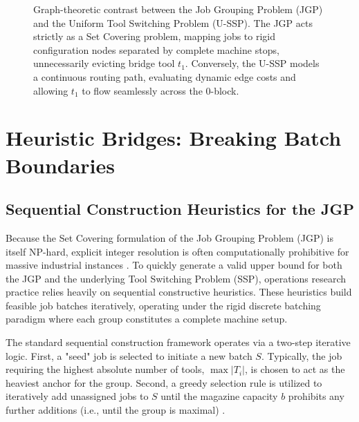 \documentclass[11pt, a4paper]{book}
\begin{document}
\begin{figure}[H]
		\caption{Graph-theoretic contrast between the Job Grouping Problem (JGP) and the Uniform Tool Switching Problem (U-SSP). The JGP acts strictly as a Set Covering problem, mapping jobs to rigid configuration nodes separated by complete machine stops, unnecessarily evicting bridge tool $t_1$. Conversely, the U-SSP models a continuous routing path, evaluating dynamic edge costs and allowing $t_1$ to flow seamlessly across the 0-block.}
		\label{fig:jgp_divergence}
	\end{figure}
	
	
	\section{Heuristic Bridges: Breaking Batch Boundaries}
	
	\subsection{Sequential Construction Heuristics for the JGP}
	
	Because the Set Covering formulation of the Job Grouping Problem (JGP) is itself NP-hard, explicit integer resolution is often computationally prohibitive for massive industrial instances %
	. To quickly generate a valid upper bound for both the JGP and the underlying Tool Switching Problem (SSP), operations research practice relies heavily on sequential constructive heuristics. These heuristics build feasible job batches iteratively, operating under the rigid discrete batching paradigm where each group constitutes a complete machine setup.
	
	The standard sequential construction framework operates via a two-step iterative logic. First, a "seed" job is selected to initiate a new batch $S$. Typically, the job requiring the highest absolute number of tools, $\max |T_i|$, is chosen to act as the heaviest anchor for the group. Second, a greedy selection rule is utilized to iteratively add unassigned jobs to $S$ until the magazine capacity $b$ prohibits any further additions (i.e., until the group is maximal) %
	.
	
\end{document}
